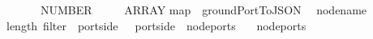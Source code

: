 \ \ \ \ {\isacharcomma}\ {\isacharparenleft}\ NUMBER\ {}{}{\isacharparenright}{\isacharbrackright}{\isacharbrackright}{\isacharparenright}\isanewline
\ \ {\isacharcomma}\ {\isacharparenleft}\ ARRAY\isanewline
{}map\ {\isacharparenleft}{\isasymlambda}\ groundPortToJSON\isanewline
{}\ {\isacharat}\ node{\isacharunderscore}name\ \isanewline
{}length\ {\isacharparenleft}filter\ {\isacharparenleft}{\isasymlambda}\ port{\isachardot}side\ \ {\isacharequal}\ port{\isachardot}side\ \ {\isacharparenleft}node{\isacharunderscore}ports\ \ {\isacharminus}\ {}{\isacharparenright}\isanewline
{}\isanewline
{}node{\isacharunderscore}ports\ 
